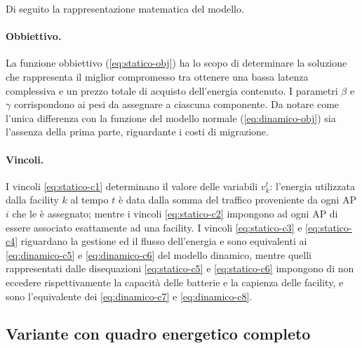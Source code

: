 Di seguito la rappresentazione matematica del modello.



\paragraph*{Obbiettivo.}

La funzione obbiettivo (\ref{eq:statico-obj}) ha lo scopo di determinare la soluzione che rappresenta il miglior compromesso tra ottenere una bassa latenza complessiva e un prezzo totale di acquisto dell'energia contenuto. I parametri $\beta$ e $\gamma$ corrispondono ai pesi da assegnare a ciascuna componente. Da notare come l'unica differenza con la funzione del modello normale (\ref{eq:dinamico-obj}) sia l'assenza della prima parte, riguardante i costi di migrazione.

\paragraph*{Vincoli.}

I vincoli \ref{eq:statico-c1} determinano il valore delle variabili $v^t_k$: l'energia utilizzata dalla facility $k$ al tempo $t$ è data dalla somma del traffico proveniente da ogni AP $i$ che le è assegnato; mentre i vincoli \ref{eq:statico-c2} impongono ad ogni AP di essere associato esattamente ad una facility. I vincoli \ref{eq:statico-c3} e \ref{eq:statico-c4} riguardano la gestione ed il flusso dell'energia e sono equivalenti ai \ref{eq:dinamico-c5} e \ref{eq:dinamico-c6} del modello dinamico, mentre quelli rappresentati dalle disequazioni \ref{eq:statico-c5} e \ref{eq:statico-c6} impongono di non eccedere rispettivamente la capacità delle batterie e la capienza delle facility, e sono l'equivalente dei \ref{eq:dinamico-c7} e \ref{eq:dinamico-c8}.


\subsection{Variante con quadro energetico completo}
\label{subsec:modello-statico-var}

